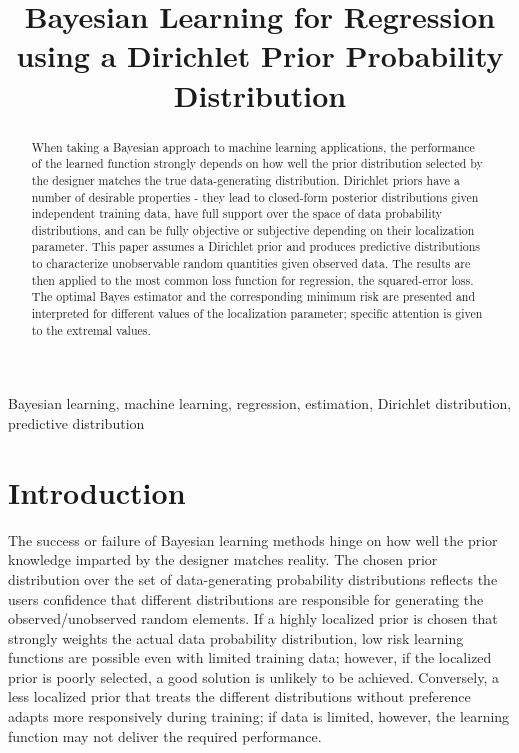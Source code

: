 \documentclass{article}
\title{Bayesian Learning for Regression using a Dirichlet Prior Probability Distribution}
\begin{document}
\maketitle


\begin{abstract}
When taking a Bayesian approach to machine learning applications, the performance of the learned function strongly depends on how well the prior distribution selected by the designer matches the true data-generating distribution. Dirichlet priors have a number of desirable properties - they lead to closed-form posterior distributions given independent training data, have full support over the space of data probability distributions, and can be fully objective or subjective depending on their localization parameter. This paper assumes a Dirichlet prior and produces predictive distributions to characterize unobservable random quantities given observed data. The results are then applied to the most common loss function for regression, the squared-error loss. The optimal Bayes estimator and the corresponding minimum risk are presented and interpreted for different values of the localization parameter; specific attention is given to the extremal values.
\end{abstract}

\begin{keywords}
Bayesian learning, machine learning, regression, estimation, Dirichlet distribution, predictive distribution
\end{keywords}



\section{Introduction}

The success or failure of Bayesian learning methods hinge on how well the prior knowledge imparted by the designer matches reality. The chosen prior distribution over the set of data-generating probability distributions reflects the users confidence that different distributions are responsible for generating the observed/unobserved random elements. If a highly localized prior is chosen that strongly weights the actual data probability distribution, low risk learning functions are possible even with limited training data; however, if the localized prior is poorly selected, a good solution is unlikely to be achieved. Conversely, a less localized prior that treats the different distributions without preference adapts more responsively during training; if data is limited, however, the learning function may not deliver the required performance.
\end{document}
